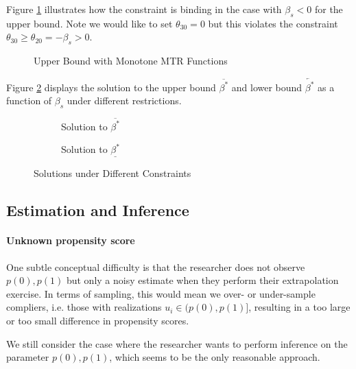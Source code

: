 \documentclass[11pt,a4paper,english]{article} %
\numberwithin{equation}{section}
\numberwithin{figure}{section}
\numberwithin{table}{section}
\theoremstyle{definition}
\theoremstyle{remark}
\begin{document}
Figure \ref{fig:sm_upper_incr.tex} illustrates how the constraint is binding in the case with $\beta_s < 0$ for the upper bound.
Note we would like to set $\theta_{30} = 0$ but this violates the constraint $\theta_{30} \geq \theta_{20} = -\beta_s > 0$.

\begin{figure}
	
	\caption{Upper Bound with Monotone MTR Functions}
	\label{fig:sm_upper_incr.tex}
\end{figure}

Figure \ref{fig:sm_sol_upper} displays the solution to the upper bound $\overline{\beta^*}$ and lower bound $\underleftarrow{\beta^*}$ as a function of $\beta_s$ under different restrictions.
\begin{figure}
	\centering
	\begin{subfigure}{0.45\textwidth}
		\centering
		
		\caption{Solution to $\overline{\beta^*}$}
	\end{subfigure}
	\hfill
	\begin{subfigure}{0.45\textwidth}
		\centering
		
		\caption{Solution to $\underline{\beta^*}$}
	\end{subfigure}
	\caption{Solutions under Different Constraints}
	\label{fig:sm_sol_upper}
\end{figure}

\subsection{Estimation and Inference}
\paragraph{Unknown propensity score}
One subtle conceptual difficulty is that the researcher does not observe $p(0), p(1)$ but only a noisy estimate when they perform their extrapolation exercise. In terms of sampling, this would mean we over- or under-sample compliers, i.e. those with realizations $u_i\in (p(0), p(1)]$, resulting in a too large or too small difference in propensity scores.

We still consider the case where the researcher wants to perform inference on the parameter $p(0), p(1)$, which seems to be the only reasonable approach.
\end{document}
